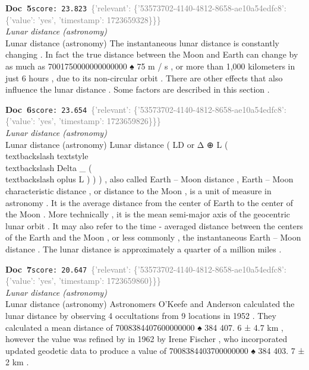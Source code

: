 \documentclass[a4paper,11pt]{article}
\begin{document}
\begin{docenv}
{\footnotesize\textcolor{doccolor}{\textbf{Doc~5}}}\hfill{\tiny\texttt{score:~23.823}}\ {\tiny\textcolor{gray}{\{'relevant': \{'53573702-4140-4812-8658-ae10a54edfc8': \{'value': 'yes', 'timestamp': 1723659328\}\}\}}}\\[3pt]
{\small\textit{Lunar distance (astronomy)}}\\[2pt]
\vspace{2pt}
{\footnotesize Lunar distance (astronomy)
The instantaneous lunar distance is constantly changing . In fact the true distance between the Moon and Earth can change by as much as 7001750000000000000 ♠ 75 m / s , or more than 1,000 kilometers in just 6 hours , due to its non-circular orbit . There are other effects that also influence the lunar distance . Some factors are described in this section .}
\end{docenv}
\begin{docenv}
{\footnotesize\textcolor{doccolor}{\textbf{Doc~6}}}\hfill{\tiny\texttt{score:~23.654}}\ {\tiny\textcolor{gray}{\{'relevant': \{'53573702-4140-4812-8658-ae10a54edfc8': \{'value': 'yes', 'timestamp': 1723659826\}\}\}}}\\[3pt]
{\small\textit{Lunar distance (astronomy)}}\\[2pt]
\vspace{2pt}
{\footnotesize Lunar distance (astronomy)
Lunar distance ( LD or Δ ⊕ L ( \\textbackslash{} textstyle \\textbackslash{} Delta \_ ( \\textbackslash{} oplus L ) ) ) , also called Earth -- Moon distance , Earth -- Moon characteristic distance , or distance to the Moon , is a unit of measure in astronomy . It is the average distance from the center of Earth to the center of the Moon . More technically , it is the mean semi-major axis of the geocentric lunar orbit . It may also refer to the time - averaged distance between the centers of the Earth and the Moon , or less commonly , the instantaneous Earth -- Moon distance . The lunar distance is approximately a quarter of a million miles .}
\end{docenv}
\begin{docenv}
{\footnotesize\textcolor{doccolor}{\textbf{Doc~7}}}\hfill{\tiny\texttt{score:~20.647}}\ {\tiny\textcolor{gray}{\{'relevant': \{'53573702-4140-4812-8658-ae10a54edfc8': \{'value': 'yes', 'timestamp': 1723659860\}\}\}}}\\[3pt]
{\small\textit{Lunar distance (astronomy)}}\\[2pt]
\vspace{2pt}
{\footnotesize Lunar distance (astronomy)
Astronomers O'Keefe and Anderson calculated the lunar distance by observing 4 occultations from 9 locations in 1952 . They calculated a mean distance of 7008384407600000000 ♠ 384 407. 6 ± 4.7 km , however the value was refined by in 1962 by Irene Fischer , who incorporated updated geodetic data to produce a value of 7008384403700000000 ♠ 384 403. 7 ± 2 km .}
\end{docenv}
\end{document}
